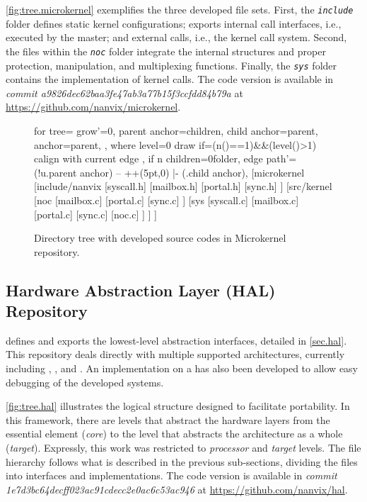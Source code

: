 		\autoref{fig:tree.microkernel} exemplifies the three developed file sets.
		First, the \textit{\texttt{include}} folder defines static kernel configurations;
		exports internal call interfaces, i.e., executed by the master; and
		external calls, i.e., the kernel call system. Second, the files within
		the \textit{\texttt{noc}} folder integrate the internal structures and proper
		protection, manipulation, and multiplexing functions. Finally, the
		\textit{\texttt{sys}} folder contains the implementation of kernel calls.
		The code version
		is available in \textit{commit a9826dec62baa3fe47ab3a77b15f3ccfdd84b79a}
		at \url{https://github.com/nanvix/microkernel}.

		\begin{figure}[!ht]
			\centering%
			\caption{Directory tree with developed source codes in Microkernel repository.}%
			\label{fig:tree.microkernel}%
			\begin{forest}
			for tree={
				grow'=0,
				parent anchor=children,
				child anchor=parent,
				anchor=parent,
			},
			where level=0{
				draw
			}{
				if={(n()==1)&&(level()>1)}{
				calign with current edge
				}{},
				if n children=0{folder}{},
				edge path'={(!u.parent anchor) -- ++(5pt,0) |- (.child anchor)},
			}
			[microkernel
				[include/nanvix
					[syscall.h]
					[mailbox.h]
					[portal.h]
					[sync.h]
				]
				[src/kernel
					[noc
						[mailbox.c]
						[portal.c]
						[sync.c]
					]
					[sys
						[syscall.c]
						[mailbox.c]
						[portal.c]
						[sync.c]
						[noc.c]
					]
				]
			]
			\end{forest}%
		\end{figure}

	\subsection{Hardware Abstraction Layer (HAL) Repository}

		\hal defines and exports the lowest-level abstraction interfaces, detailed
		in \autoref{sec.hal}. This repository deals directly with multiple supported
		architectures, currently including \mppa, \optimsoc, and \hero.
		An implementation on a \unix \os has also been developed to allow easy
		debugging of the developed systems.

		\autoref{fig:tree.hal} illustrates the logical structure designed to
		facilitate \hal portability. In this framework, there are levels that
		abstract the hardware layers from the essential element (\textit{core})
		to the level that abstracts the architecture as a whole (\textit{target}).
		Expressly, this work was restricted to \textit{processor} and
		\textit{target} levels. The file hierarchy follows what is described in
		the previous sub-sections, dividing the files into interfaces and
		implementations. The code version is available in
		\textit{commit 1e7d3bc64decff023ac91cdecc2e0ac6c53ac946} at
		\url{https://github.com/nanvix/hal}.

